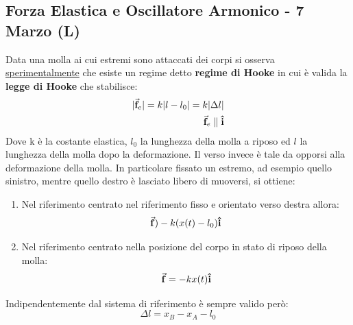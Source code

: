 \documentclass{article}
\renewcommand{\i}{\vu{i}}
\newcommand{\f}{\va{f}}
\begin{document}
\subsection{Forza Elastica e Oscillatore Armonico - 7 Marzo (L)}

Data una molla ai cui estremi sono attaccati dei corpi si osserva \underline{sperimentalmente} che esiste un regime detto \textbf{regime di Hooke} in cui è valida la \textbf{legge di Hooke} che stabilisce:
\begin{align}
\label{leggehooke}
    |\f_e|=k|l-l_0|=k|\Delta l|\\
    \f_e\parallel \i
\end{align}
Dove k è la costante elastica, $l_0$ la lunghezza della molla a riposo ed $l$ la lunghezza della molla dopo la deformazione.
Il verso invece è tale da opporsi alla deformazione della molla. In particolare fissato un estremo, ad esempio quello sinistro, mentre quello destro è lasciato libero di muoversi, si ottiene:
\begin{enumerate}
    \item Nel riferimento centrato nel riferimento fisso e orientato verso destra allora:
    \[\f)-k(x(t)-l_0)\i\]
    \item Nel riferimento centrato nella posizione del corpo in stato di riposo della molla:
    \[\f=-kx(t)\i\]
\end{enumerate}
Indipendentemente dal sistema di riferimento è sempre valido però:
\[\Delta l=x_B-x_A-l_0\]
\end{document}
